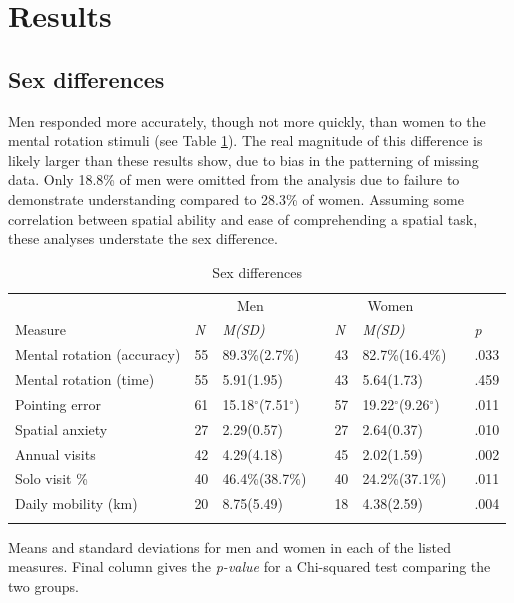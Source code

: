 \section{Results}
\label{sec:3}
	\subsection{Sex differences}
	\label{sec:3.1}
Men responded more accurately, though not more quickly, than women to the mental rotation stimuli (see Table \ref{tab:sex}).  The real magnitude of this difference is likely larger than these results show, due to bias in the patterning of missing data.  Only 18.8\% of men were omitted from the analysis due to failure to demonstrate understanding compared to 28.3\% of women.  Assuming some correlation between spatial ability and ease of comprehending a spatial task, these analyses understate the sex difference.  

\begin{table}[h!]
\caption{Sex differences}
\label{tab:sex}  
\begin{tabular}{llllllll}
\hline\noalign{\smallskip}
& \multicolumn{2}{c}{Men} && \multicolumn{2}{c}{Women} && \\
Measure & \emph{N} & \emph{M(SD)} && \emph{N} & \emph{M(SD)} && \emph{p} \\
\noalign{\smallskip}\hline\noalign{\smallskip}
Mental rotation (accuracy) & 55 & 89.3\%(2.7\%) && 43 & 82.7\%(16.4\%) && .033 \\
Mental rotation (time) & 55 & 5.91(1.95) && 43 & 5.64(1.73) && .459 \\
Pointing error & 61 & 15.18$^{\circ}$(7.51$^{\circ}$) && 57 & 19.22$^{\circ}$(9.26$^{\circ}$) && .011 \\
Spatial anxiety & 27 & 2.29(0.57) && 27 & 2.64(0.37) && .010 \\
Annual visits & 42 & 4.29(4.18) && 45 & 2.02(1.59) && .002 \\
Solo visit \% & 40 & 46.4\%(38.7\%) && 40 & 24.2\%(37.1\%) && .011 \\
Daily mobility (km) & 20 & 8.75(5.49) && 18 & 4.38(2.59) && .004 \\
\noalign{\smallskip}\hline
\end{tabular}\par
\bigskip
Means and standard deviations for men and women in each of the listed measures. Final column gives the \emph{p-value} for a Chi-squared test comparing the two groups. 
\end{table}		  

